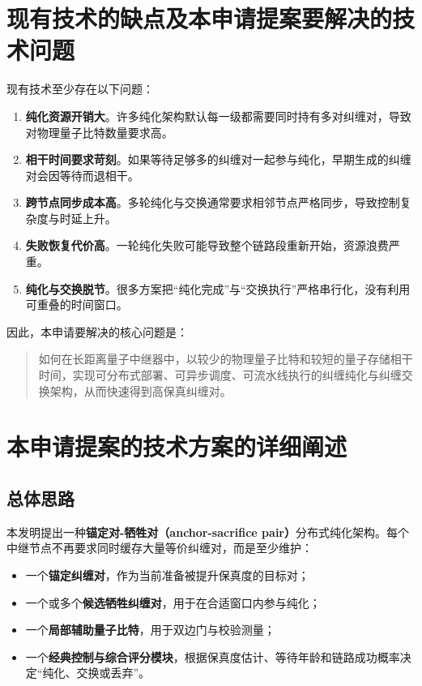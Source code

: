 \documentclass[12pt,a4paper]{article}
\begin{document}
\section{现有技术的缺点及本申请提案要解决的技术问题}

现有技术至少存在以下问题：
\begin{enumerate}[label=(\arabic*)]
    \item \textbf{纯化资源开销大}。许多纯化架构默认每一级都需要同时持有多对纠缠对，导致对物理量子比特数量要求高。
    \item \textbf{相干时间要求苛刻}。如果等待足够多的纠缠对一起参与纯化，早期生成的纠缠对会因等待而退相干。
    \item \textbf{跨节点同步成本高}。多轮纯化与交换通常要求相邻节点严格同步，导致控制复杂度与时延上升。
    \item \textbf{失败恢复代价高}。一轮纯化失败可能导致整个链路段重新开始，资源浪费严重。
    \item \textbf{纯化与交换脱节}。很多方案把“纯化完成”与“交换执行”严格串行化，没有利用可重叠的时间窗口。
\end{enumerate}

因此，本申请要解决的核心问题是：
\begin{quote}
如何在长距离量子中继器中，以较少的物理量子比特和较短的量子存储相干时间，实现可分布式部署、可异步调度、可流水线执行的纠缠纯化与纠缠交换架构，从而快速得到高保真纠缠对。
\end{quote}

\section{本申请提案的技术方案的详细阐述}

\subsection{总体思路}

本发明提出一种\textbf{锚定对-牺牲对（anchor-sacrifice pair）}分布式纯化架构。每个中继节点不再要求同时缓存大量等价纠缠对，而是至少维护：
\begin{itemize}[noitemsep]
    \item 一个\textbf{锚定纠缠对}，作为当前准备被提升保真度的目标对；
    \item 一个或多个\textbf{候选牺牲纠缠对}，用于在合适窗口内参与纯化；
    \item 一个\textbf{局部辅助量子比特}，用于双边门与校验测量；
    \item 一个\textbf{经典控制与综合评分模块}，根据保真度估计、等待年龄和链路成功概率决定“纯化、交换或丢弃”。
\end{itemize}
\end{document}
